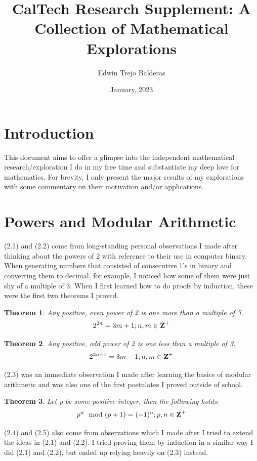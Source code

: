 \documentclass{article}
\title{CalTech Research Supplement: A Collection of Mathematical Explorations}
\author{Edwin Trejo Balderas}
\date{January, 2023}
\newtheorem{theorem}{Theorem}[section]
\begin{document}
\maketitle

\section{Introduction}
This document aims to offer a glimpse into the independent mathematical research/exploration I do in my free time and substantiate my deep love for mathematics. For brevity, I only present the major results of my explorations with some commentary on their motivation and/or applications.

\section{Powers and Modular Arithmetic}

(2.1) and (2.2) come from long-standing personal observations I made after thinking about the powers of 2 with reference to their use in computer binary. When generating numbers that consisted of consecutive 1's in binary and converting them to decimal, for example, I noticed how some of them were just shy of a multiple of 3. When I first learned how to do proofs by induction, these were the first two theorems I proved.

\begin{theorem}
    Any positive, even power of 2 is one more than a multiple of 3. 
    $$2^{2n}=3m+1;n,m\in\mbox{\textbf{Z}}^+$$
\end{theorem}

\begin{theorem}
    Any positive, odd power of 2 is one less than a multiple of 3. 
    $$2^{2n-1}=3m-1;n,m\in\mbox{\textbf{Z}}^+$$
\end{theorem}

(2.3) was an immediate observation I made after learning the basics of modular arithmetic and was also one of the first postulates I proved outside of school.

\begin{theorem}
    Let \mbox{p} be some positive integer, then the following holds:
    $$p^n\mod{(p+1)}=(-1)^n;p,n\in\mbox{\textbf{Z}}^+$$
\end{theorem}

(2.4) and (2.5) also come from observations which I made after I tried to extend the ideas in (2.1) and (2.2). I tried proving them by induction in a similar way I did (2.1) and (2.2), but ended up relying heavily on (2.3) instead.
\end{document}
